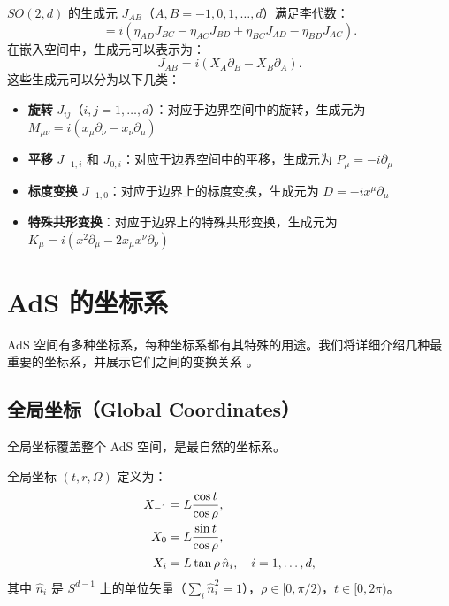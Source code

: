 $SO(2,d)$ 的生成元 $J_{AB}$（$A, B = -1, 0, 1, \ldots, d$）满足李代数：
\begin{equation}
    [J_{AB}, J_{CD}] = i(\eta_{AD} J_{BC} - \eta_{AC} J_{BD} + \eta_{BC} J_{AD} - \eta_{BD} J_{AC}).
\end{equation}
在嵌入空间中，生成元可以表示为：
\begin{equation}
    J_{AB} = i(X_A \partial_B - X_B \partial_A).
\end{equation}
这些生成元可以分为以下几类：
\begin{itemize}
    \item \textbf{旋转} $J_{ij}$（$i, j = 1, \ldots, d$）：对应于边界空间中的旋转，生成元为 $M_{\mu\nu} = i(x_\mu \partial_\nu - x_\nu \partial_\mu)$
    \item \textbf{平移} $J_{-1,i}$ 和 $J_{0,i}$：对应于边界空间中的平移，生成元为 $P_\mu = -i\partial_\mu$
    \item \textbf{标度变换} $J_{-1,0}$：对应于边界上的标度变换，生成元为 $D = -ix^\mu \partial_\mu$
    \item \textbf{特殊共形变换}：对应于边界上的特殊共形变换，生成元为 $K_\mu = i(x^2 \partial_\mu - 2x_\mu x^\nu \partial_\nu)$
\end{itemize}

\section{AdS 的坐标系}

AdS 空间有多种坐标系，每种坐标系都有其特殊的用途。我们将详细介绍几种最重要的坐标系，并展示它们之间的变换关系 \cite{Aharony1999}。

\subsection{全局坐标（Global Coordinates）}

全局坐标覆盖整个 AdS 空间，是最自然的坐标系。

\begin{definition}[全局坐标]
全局坐标 $(t, r, \Omega)$ 定义为：
\begin{align}
    X_{-1} &= L \frac{\cos t}{\cos \rho}, \notag \\
    X_0 &= L \frac{\sin t}{\cos \rho}, \notag \\
    X_i &= L \tan \rho \, \hat{n}_i, \quad i = 1, \ldots, d,
\end{align}
其中 $\hat{n}_i$ 是 $S^{d-1}$ 上的单位矢量（$\sum_i \hat{n}_i^2 = 1$），$\rho \in [0, \pi/2)$，$t \in [0, 2\pi)$。
\end{definition}

